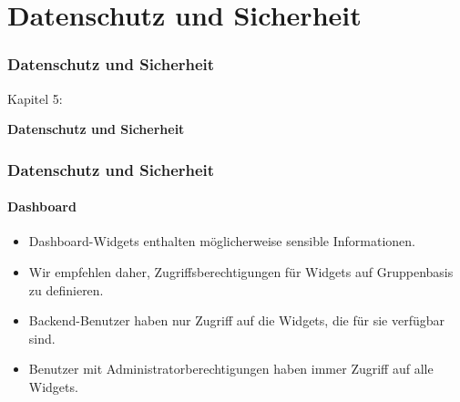 %

\section{Datenschutz und Sicherheit}
\begin{frame}[fragile]
	\frametitle{Datenschutz und Sicherheit}

	\begin{center}\huge{Kapitel 5:}\end{center}
	\begin{center}\huge{\color{typo3darkgrey}\textbf{Datenschutz und Sicherheit}}\end{center}

\end{frame}


\begin{frame}[fragile]
	\frametitle{Datenschutz und Sicherheit}
	\framesubtitle{Dashboard}

	\begin{itemize}
		\item Dashboard-Widgets enthalten möglicherweise sensible Informationen.
		\item Wir empfehlen daher, Zugriffsberechtigungen für Widgets auf Gruppenbasis zu definieren.
		\item Backend-Benutzer haben nur Zugriff auf die Widgets, die für sie verfügbar sind.
		\item Benutzer mit Administratorberechtigungen haben immer Zugriff auf alle Widgets.
	\end{itemize}

\end{frame}


